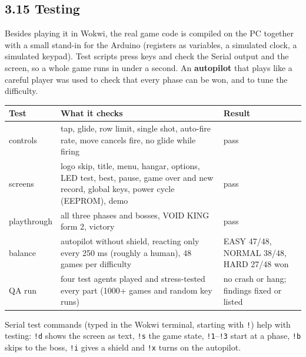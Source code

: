 \documentclass[11pt,a4paper]{article}
\begin{document}
\subsection*{3.15 Testing}
Besides playing it in Wokwi, the real game code is compiled on the PC together with a small stand-in for the Arduino (registers as variables, a simulated clock, a simulated keypad). Test scripts press keys and check the Serial output and the screen, so a whole game runs in under a second. An \textbf{autopilot} that plays like a careful player was used to check that every phase can be won, and to tune the difficulty.

\par\noindent\begin{minipage}{\linewidth}\centering\small
\begin{tabular}{|>{\raggedright\arraybackslash}p{2.39cm}|>{\raggedright\arraybackslash}p{9.56cm}|>{\raggedright\arraybackslash}p{4.30cm}|}
\hline\rowcolor{accent}\textbf{\color{white}Test} & \textbf{\color{white}What it checks} & \textbf{\color{white}Result}\\\hline
controls & tap, glide, row limit, single shot, auto-fire rate, move cancels fire, no glide while firing & pass\\\hline
\rowcolor{rowshade}screens & logo skip, title, menu, hangar, options, LED test, best, pause, game over and new record, global keys, power cycle (EEPROM), demo & pass\\\hline
playthrough & all three phases and bosses, VOID KING form 2, victory & pass\\\hline
\rowcolor{rowshade}balance & autopilot without shield, reacting only every 250 ms (roughly a human), 48 games per difficulty & EASY 47/48, NORMAL 38/48, HARD 27/48 won\\\hline
QA run & four test agents played and stress-tested every part (1000+ games and random key runs) & no crash or hang; findings fixed or listed\\\hline
\end{tabular}
\end{minipage}\par\medskip

Serial test commands (typed in the Wokwi terminal, starting with \texttt{!}) help with testing: \texttt{!d} shows the screen as text, \texttt{!s} the game state, \texttt{!1}–\texttt{!3} start at a phase, \texttt{!b} skips to the boss, \texttt{!i} gives a shield and \texttt{!x} turns on the autopilot.
\end{document}
